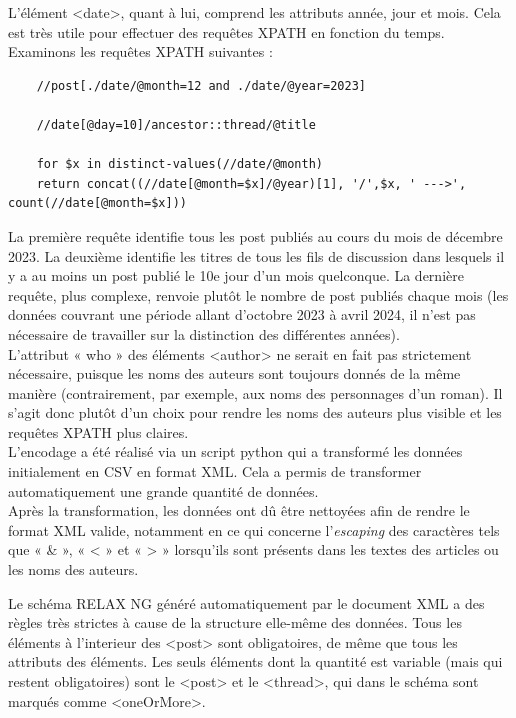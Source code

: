 \documentclass[12pt,a4paper]{article}
\begin{document}
L'élément <date>, quant à lui, comprend les attributs année, jour et mois. Cela est très utile pour effectuer des requêtes XPATH en fonction du temps. Examinons les requêtes XPATH suivantes :\\

\begin{lstlisting}
	//post[./date/@month=12 and ./date/@year=2023]
	
	//date[@day=10]/ancestor::thread/@title
	
	for $x in distinct-values(//date/@month) 
	return concat((//date[@month=$x]/@year)[1], '/',$x, ' --->', count(//date[@month=$x]))
\end{lstlisting}

La première requête identifie tous les post publiés au cours du mois de décembre 2023. La deuxième identifie les titres de tous les fils de discussion dans lesquels il y a au moins un post publié le 10e jour d'un mois quelconque. La dernière requête, plus complexe, renvoie plutôt le nombre de post publiés chaque mois (les données couvrant une période allant d'octobre 2023 à avril 2024, il n'est pas nécessaire de travailler sur la distinction des différentes années). \\

L'attribut « who » des éléments <author> ne serait en fait pas strictement nécessaire, puisque les noms des auteurs sont toujours donnés de la même manière (contrairement, par exemple, aux noms des personnages d'un roman). Il s'agit donc plutôt d'un choix pour rendre les noms des auteurs plus visible et les requêtes XPATH plus claires.\\

L'encodage a été réalisé via un script python qui a transformé les données initialement en CSV en format XML. Cela a permis de transformer automatiquement une grande quantité de données. \\
Après la transformation, les données ont dû être nettoyées afin de rendre le format XML valide, notamment en ce qui concerne l'\emph{escaping} des caractères tels que « \& », « < » et « > » lorsqu'ils sont présents dans les textes des articles ou les noms des auteurs.

Le schéma RELAX NG généré automatiquement par le document XML a des règles très strictes à cause de la structure elle-même des données. Tous les éléments à l'interieur des <post> sont obligatoires, de même que tous les attributs des éléments. Les seuls éléments dont la quantité est variable (mais qui restent obligatoires) sont le <post> et le <thread>, qui dans le schéma sont marqués comme <oneOrMore>.
\end{document}
